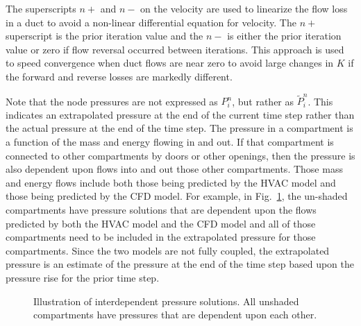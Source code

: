 The superscripts $n+$ and $n-$ on the velocity are used to linearize the flow loss in a duct to avoid a non-linear differential equation for velocity.
The $n+$ superscript is the prior iteration value and the $n-$ is either the prior iteration value or zero if flow reversal occurred between iterations.
This approach is used to speed convergence when duct flows are near zero to avoid large changes in $K$ if the forward and reverse losses are markedly different.

Note that the node pressures are not expressed as $P^n_i$, but rather as $\tilde{P}^n_i$.  This indicates an extrapolated pressure at the end of the current time step
rather than the actual pressure at the end of the time step.  The pressure in a compartment is a function of the mass and energy flowing in and out.
If that compartment is connected to other compartments by doors or other openings, then the pressure is also dependent upon flows into and out those other compartments.
Those mass and energy flows include both those being predicted by the HVAC model and those being predicted by the CFD model.
For example, in Fig.~\ref{hvacpressure}, the un-shaded compartments have pressure solutions that are dependent upon the flows predicted by both the
HVAC model and the CFD model and all of those compartments need to be included in the extrapolated pressure for those compartments.
Since the two models are not fully coupled, the extrapolated pressure is an estimate of the pressure at the end of the time step based upon the pressure rise for the prior time step.

\begin{figure}[ht!]
   \begin{center}
      \caption{\label{hvacpressure} Illustration of interdependent pressure solutions.  All unshaded compartments have pressures that are dependent upon each other.}
   \end{center}
\end{figure}

